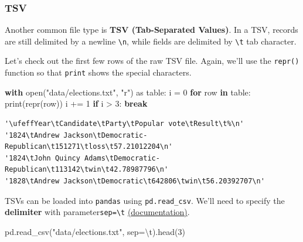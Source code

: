 \documentclass[
  letterpaper,
  DIV=11,
  numbers=noendperiod]{scrreprt}
\newenvironment{Shaded}{\begin{snugshade}}{\end{snugshade}}
\newcommand{\BuiltInTok}[1]{\textcolor[rgb]{0.00,0.23,0.31}{#1}}
\newcommand{\CharTok}[1]{\textcolor[rgb]{0.13,0.47,0.30}{#1}}
\newcommand{\ControlFlowTok}[1]{\textcolor[rgb]{0.00,0.23,0.31}{\textbf{#1}}}
\newcommand{\DecValTok}[1]{\textcolor[rgb]{0.68,0.00,0.00}{#1}}
\newcommand{\ImportTok}[1]{\textcolor[rgb]{0.00,0.46,0.62}{#1}}
\newcommand{\KeywordTok}[1]{\textcolor[rgb]{0.00,0.23,0.31}{\textbf{#1}}}
\newcommand{\NormalTok}[1]{\textcolor[rgb]{0.00,0.23,0.31}{#1}}
\newcommand{\OperatorTok}[1]{\textcolor[rgb]{0.37,0.37,0.37}{#1}}
\newcommand{\StringTok}[1]{\textcolor[rgb]{0.13,0.47,0.30}{#1}}
\begin{document}
\subsubsection{TSV}\label{tsv}

Another common file type is \textbf{TSV (Tab-Separated Values)}. In a
TSV, records are still delimited by a newline
\texttt{\textbackslash{}n}, while fields are delimited by
\texttt{\textbackslash{}t} tab character.

Let's check out the first few rows of the raw TSV file. Again, we'll use
the \texttt{repr()} function so that \texttt{print} shows the special
characters.

\begin{Shaded}
\begin{Highlighting}[]
\ControlFlowTok{with} \BuiltInTok{open}\NormalTok{(}\StringTok{"data/elections.txt"}\NormalTok{, }\StringTok{"r"}\NormalTok{) }\ImportTok{as}\NormalTok{ table:}
\NormalTok{    i }\OperatorTok{=} \DecValTok{0}
    \ControlFlowTok{for}\NormalTok{ row }\KeywordTok{in}\NormalTok{ table:}
        \BuiltInTok{print}\NormalTok{(}\BuiltInTok{repr}\NormalTok{(row))}
\NormalTok{        i }\OperatorTok{+=} \DecValTok{1}
        \ControlFlowTok{if}\NormalTok{ i }\OperatorTok{\textgreater{}} \DecValTok{3}\NormalTok{:}
            \ControlFlowTok{break}
\end{Highlighting}
\end{Shaded}

\begin{verbatim}
'\ufeffYear\tCandidate\tParty\tPopular vote\tResult\t%\n'
'1824\tAndrew Jackson\tDemocratic-Republican\t151271\tloss\t57.21012204\n'
'1824\tJohn Quincy Adams\tDemocratic-Republican\t113142\twin\t42.78987796\n'
'1828\tAndrew Jackson\tDemocratic\t642806\twin\t56.20392707\n'
\end{verbatim}

TSVs can be loaded into \texttt{pandas} using \texttt{pd.read\_csv}.
We'll need to specify the \textbf{delimiter} with
parameter\texttt{sep=\textquotesingle{}\textbackslash{}t\textquotesingle{}}
\href{https://pandas.pydata.org/docs/reference/api/pandas.read_csv.html}{(documentation)}.

\begin{Shaded}
\begin{Highlighting}[]
\NormalTok{pd.read\_csv(}\StringTok{"data/elections.txt"}\NormalTok{, sep}\OperatorTok{=}\StringTok{\textquotesingle{}}\CharTok{\textbackslash{}t}\StringTok{\textquotesingle{}}\NormalTok{).head(}\DecValTok{3}\NormalTok{)}
\end{Highlighting}
\end{Shaded}
\end{document}
